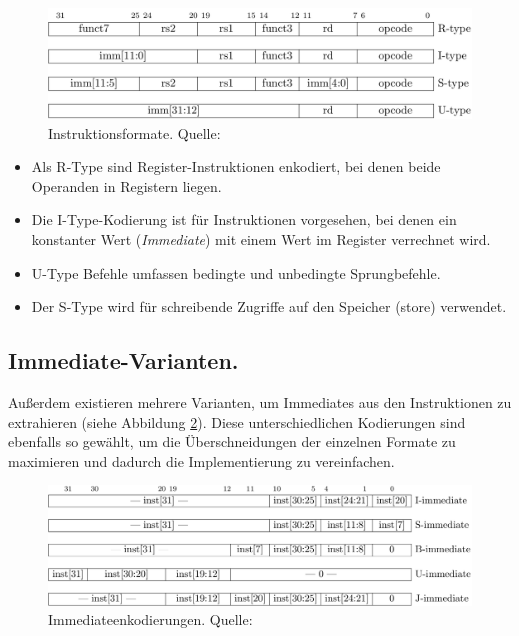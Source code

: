\begin{figure} [ht]
  \centering
  \includegraphics[width=\textwidth]{Figures/instruction_formats}
  \caption{Instruktionsformate. Quelle: \citep[S. 11]{RISC}}
  \label{fig:instr_types}
\end{figure}

\begin{itemize}  
\item Als R-Type sind Register-Instruktionen enkodiert, bei denen beide Operanden in Registern liegen. 
\item Die I-Type-Kodierung ist für Instruktionen vorgesehen, bei denen ein konstanter Wert (\textit{Immediate}) mit einem Wert im Register verrechnet wird.
\item U-Type Befehle umfassen bedingte und unbedingte Sprungbefehle.
\item Der S-Type wird für schreibende Zugriffe auf den Speicher (store) verwendet. 
\end{itemize}

\subsection{Immediate-Varianten.} Außerdem existieren mehrere Varianten,
um Immediates aus den Instruktionen zu extrahieren (siehe Abbildung
\ref{fig:immediates}). Diese unterschiedlichen Kodierungen sind ebenfalls so gewählt, um die Überschneidungen der einzelnen Formate zu maximieren und dadurch die Implementierung zu vereinfachen. \cite[S. 11f.]{RISC} 

\begin{figure} [ht]
  \centering
  \includegraphics[width=\textwidth]{Figures/immediates}
  \caption{Immediateenkodierungen. Quelle: \citep[S. 12]{RISC}}
  \label{fig:immediates}
\end{figure}

